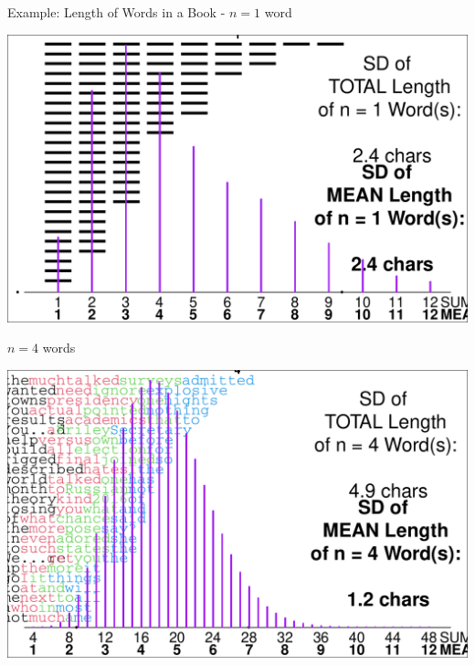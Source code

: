 \documentclass[10pt]{beamer}\usepackage[]{graphicx}\usepackage[]{color}
\makeatletter
\def\maxwidth{ %
  \ifdim\Gin@nat@width>\linewidth
    \linewidth
  \else
    \Gin@nat@width
  \fi
}
\newenvironment{knitrout}{}{} %
\makeatother
\begin{document}
\begin{frame}[fragile]{Example: Length of Words in a Book - $n = 1$ word}
\begin{knitrout}\tiny
{}\color{fgcolor}

{\centering \includegraphics[width=\maxwidth]{figure/unnamed-chunk-12-1} 

}


\end{knitrout}
\end{frame}

\begin{frame}[fragile]{$n = 4$ words}
\begin{knitrout}\tiny
{}\color{fgcolor}

{\centering \includegraphics[width=\maxwidth]{figure/unnamed-chunk-13-1} 

}


\end{knitrout}
\end{frame}
\end{document}
